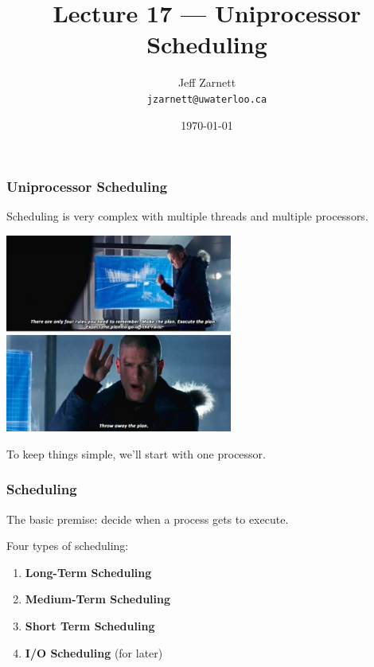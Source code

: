 

\title{Lecture 17 --- Uniprocessor Scheduling }

\author{Jeff Zarnett \\ \small \texttt{jzarnett@uwaterloo.ca}}
\date{\today}




\begin{frame}
  \titlepage

 \end{frame}



\begin{frame}
\frametitle{Uniprocessor Scheduling}

Scheduling is very complex with multiple threads and multiple processors.

\begin{center}
	\includegraphics[width=0.56\textwidth]{images/makeplan.jpg}
\end{center}

To keep things simple, we'll start with one processor.


\end{frame}


\begin{frame}
\frametitle{Scheduling}

The basic premise: decide when a process gets to execute. 

Four types of scheduling: 

\begin{enumerate}
	\item \textbf{Long-Term Scheduling}
	\item \textbf{Medium-Term Scheduling}
	\item \textbf{Short Term Scheduling}
	\item \textbf{I/O Scheduling} (for later)
\end{enumerate}

\end{frame}



